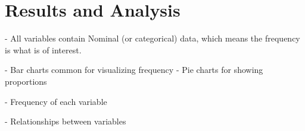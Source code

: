 
\chapter{Results and Analysis}

- All variables contain Nominal (or categorical) data, which means the frequency is what is of interest.

- Bar charts common for visualizing frequency
- Pie charts for showing proportions


- Frequency of each variable

- Relationships between variables

\cleardoublepage
